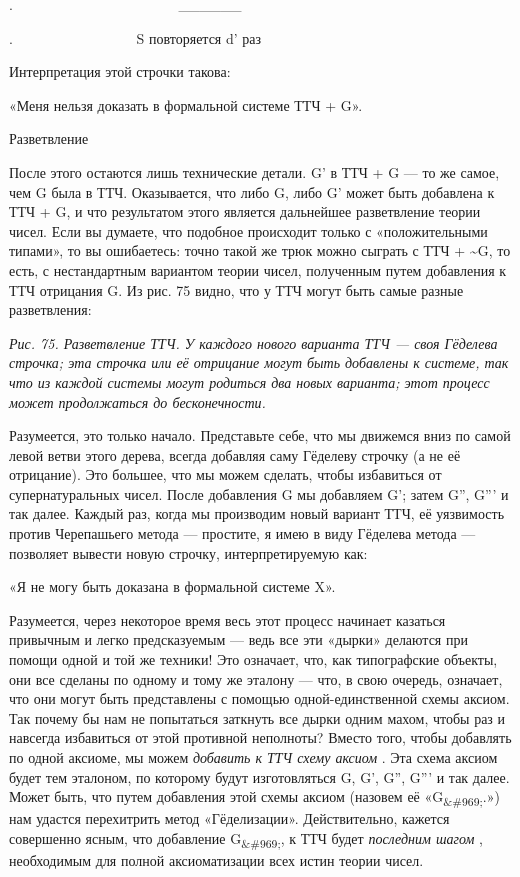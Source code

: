 \documentclass[../main.tex]{subfiles}
\begin{document}
.~~~~~~~~~~~~~~~~~~~~~~~ \textbar\_\_\_\_\_\_\textbar{}

.~~~~~~~~~~~~~~~~~ S повторяется d' раз

Интерпретация этой строчки такова:

«Меня нельзя доказать в формальной системе ТТЧ + G».

Разветвление

После этого остаются лишь технические детали. G' в ТТЧ + G --- то же самое, чем G была в ТТЧ. Оказывается, что либо G, либо G' может быть добавлена к ТТЧ + G, и что результатом этого является дальнейшее разветвление теории чисел. Если вы думаете, что подобное происходит только с «положительными типами», то вы ошибаетесь: точно такой же трюк можно сыграть с ТТЧ + \textasciitilde G, то есть, с нестандартным вариантом теории чисел, полученным путем добавления к ТТЧ отрицания G. Из рис. 75 видно, что у ТТЧ могут быть самые разные разветвления:

\emph{Рис. 75. Разветвление ТТЧ. У каждого нового варианта ТТЧ --- своя Гёделева строчка; эта строчка или её отрицание могут быть добавлены к системе, так что из каждой системы могут родиться два новых варианта; этот процесс может продолжаться до бесконечности.}

Разумеется, это только начало. Представьте себе, что мы движемся вниз по самой левой ветви этого дерева, всегда добавляя саму Гёделеву строчку (а не её отрицание). Это большее, что мы можем сделать, чтобы избавиться от супернатуральных чисел. После добавления G мы добавляем G'; затем G'', G''' и так далее. Каждый раз, когда мы производим новый вариант ТТЧ, её уязвимость против Черепашьего метода --- простите, я имею в виду Гёделева метода --- позволяет вывести новую строчку, интерпретируемую как:

«Я не могу быть доказана в формальной системе X».

Разумеется, через некоторое время весь этот процесс начинает казаться привычным и легко предсказуемым --- ведь все эти «дырки» делаются при помощи одной и той же техники! Это означает, что, как типографские объекты, они все сделаны по одному и тому же эталону --- что, в свою очередь, означает, что они могут быть представлены с помощью одной-единственной схемы аксиом. Так почему бы нам не попытаться заткнуть все дырки одним махом, чтобы раз и навсегда избавиться от этой противной неполноты? Вместо того, чтобы добавлять по одной аксиоме, мы можем \emph{добавить к ТТЧ схему аксиом} . Эта схема аксиом будет тем эталоном, по которому будут изготовляться G, G', G'', G''' и так далее. Может быть, что путем добавления этой схемы аксиом (назовем её «G\textsubscript{\&\#969;}.») нам удастся перехитрить метод «Гёделизации». Действительно, кажется совершенно ясным, что добавление G\textsubscript{\&\#969;}, к ТТЧ будет \emph{последним шагом} , необходимым для полной аксиоматизации всех истин теории чисел.
\end{document}
